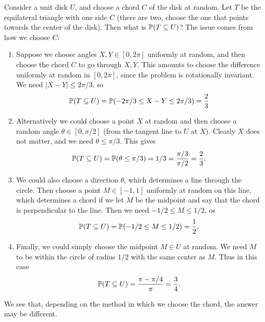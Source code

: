 \begin{example}
  Consider a unit disk $U$, and choose a chord
  $C$ of the disk at random. Let $T$ be the
  equilateral triangle with one side $C$ (there
  are two, choose the one that points towards the
  center of the disk). Then what is $\mathbb{P}(T \subseteq U)$?
  The issue comes from how we choose $C$:
  \begin{enumerate}
    \item Suppose we choose angles $X, Y \in [0, 2\pi]$
      uniformly at random, and then choose the chord
      $C$ to go through $X, Y$. This amounts to
      choose the difference uniformly at random
      in $[0, 2\pi]$, since the problem is
      rotationally invariant. We need $|X - Y| \le 2\pi / 3$, so
      \[\mathbb{P}(T \subseteq U) = \mathbb{P}(-2\pi / 3 \le X - Y \le 2 \pi / 3) = \frac{2}{3}\]
    \item Alternatively we could choose a point
      $X$ at random and then choose a random angle
      $\theta \in [0, \pi / 2]$ (from the tangent
      line to $U$ at $X$). Clearly $X$ does not
      matter, and we need $\theta \le \pi / 3$.
      This gives
      \[\mathbb{P}(T \subseteq U) =
        \mathbb{P}(\theta \le \pi / 3) = 1 / 3
        = \frac{\pi / 3}{\pi / 2} = \frac{2}{3}.
      \]
    \item We could also choose a direction
      $\theta$, which determines a line through the
      circle. Then choose a point $M \in [-1, 1]$
      uniformly at random on this line, which
      determines a chord if we let $M$ be the
      midpoint and say that the chord is perpendicular
      to the line. Then we need
      $- 1 / 2 \le M \le 1 / 2$, os
      \[
        \mathbb{P}(T \subseteq U) = \mathbb{P}(-1 / 2 \le M \le 1 / 2) =
        \frac{1}{2}.
      \]
    \item Finally, we could simply choose the
      midpoint $M \in U$ at random. We need
      $M$ to be within the circle of radius $1 / 2$
      with the same center as $M$. Thus
      in this case
      \[
        \mathbb{P}(T \subseteq U) = \frac{\pi - \pi / 4}{\pi}
        = \frac{3}{4}.
      \]
  \end{enumerate}
  We see that, depending on the method in
  which we choose the chord, the answer may be
  different.
\end{example}

